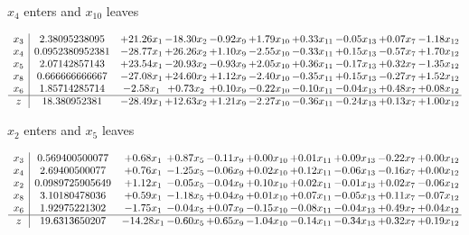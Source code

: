 \documentclass[9pt]{article}
\begin{document}
 $ x_{4} $ enters and $ x_{10} $ leaves 

 \[\begin{array}{c| c c@{\hskip 2pt} c@{\hskip 2pt} c@{\hskip 2pt} c@{\hskip 2pt} c@{\hskip 2pt} c@{\hskip 2pt} c@{\hskip 2pt} c@{\hskip 2pt} }
 x_{3}   &  2.38095238095 & + 21.26 x_{1} & -18.30 x_{2} & -0.92 x_{9} & +  1.79 x_{10} & +  0.33 x_{11} & -0.05 x_{13} & +  0.07 x_{7} & -1.18 x_{12}\\
 x_{4}   &  0.0952380952381 & -28.77 x_{1} & + 26.26 x_{2} & +  1.10 x_{9} & -2.55 x_{10} & -0.33 x_{11} & +  0.15 x_{13} & -0.57 x_{7} & +  1.70 x_{12}\\
 x_{5}   &  2.07142857143 & + 23.54 x_{1} & -20.93 x_{2} & -0.93 x_{9} & +  2.05 x_{10} & +  0.36 x_{11} & -0.17 x_{13} & +  0.32 x_{7} & -1.35 x_{12}\\
 x_{8}   &  0.666666666667 & -27.08 x_{1} & + 24.60 x_{2} & +  1.12 x_{9} & -2.40 x_{10} & -0.35 x_{11} & +  0.15 x_{13} & -0.27 x_{7} & +  1.52 x_{12}\\
 x_{6}   &  1.85714285714 & -2.58 x_{1} & +  0.73 x_{2} & +  0.10 x_{9} & -0.22 x_{10} & -0.10 x_{11} & -0.04 x_{13} & +  0.48 x_{7} & +  0.08 x_{12}\\
\hline
z    &  18.380952381 & -28.49 x_{1} & + 12.63 x_{2} & +  1.21 x_{9} & -2.27 x_{10} & -0.36 x_{11} & -0.24 x_{13} & +  0.13 x_{7} & +  1.00 x_{12}\\
\end{array}\]


 $ x_{2} $ enters and $ x_{5} $ leaves 

 \[\begin{array}{c| c c@{\hskip 2pt} c@{\hskip 2pt} c@{\hskip 2pt} c@{\hskip 2pt} c@{\hskip 2pt} c@{\hskip 2pt} c@{\hskip 2pt} c@{\hskip 2pt} }
 x_{3}   &  0.569400500077 & +  0.68 x_{1} & +  0.87 x_{5} & -0.11 x_{9} & +  0.00 x_{10} & +  0.01 x_{11} & +  0.09 x_{13} & -0.22 x_{7} & +  0.00 x_{12}\\
 x_{4}   &  2.69400500077 & +  0.76 x_{1} & -1.25 x_{5} & -0.06 x_{9} & +  0.02 x_{10} & +  0.12 x_{11} & -0.06 x_{13} & -0.16 x_{7} & +  0.00 x_{12}\\
 x_{2}   &  0.0989725905649 & +  1.12 x_{1} & -0.05 x_{5} & -0.04 x_{9} & +  0.10 x_{10} & +  0.02 x_{11} & -0.01 x_{13} & +  0.02 x_{7} & -0.06 x_{12}\\
 x_{8}   &  3.10180478036 & +  0.59 x_{1} & -1.18 x_{5} & +  0.04 x_{9} & +  0.01 x_{10} & +  0.07 x_{11} & -0.05 x_{13} & +  0.11 x_{7} & -0.07 x_{12}\\
 x_{6}   &  1.92975221302 & -1.75 x_{1} & -0.04 x_{5} & +  0.07 x_{9} & -0.15 x_{10} & -0.08 x_{11} & -0.04 x_{13} & +  0.49 x_{7} & +  0.04 x_{12}\\
\hline
z    &  19.6313650207 & -14.28 x_{1} & -0.60 x_{5} & +  0.65 x_{9} & -1.04 x_{10} & -0.14 x_{11} & -0.34 x_{13} & +  0.32 x_{7} & +  0.19 x_{12}\\
\end{array}\]
\end{document}
